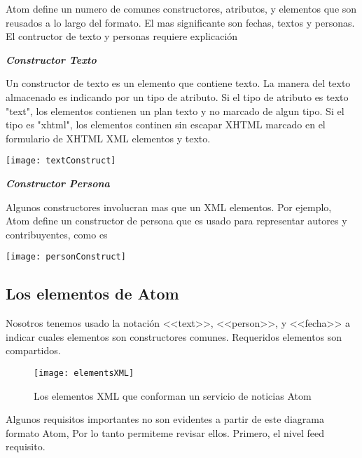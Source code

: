 Atom define un numero de comunes constructores, atributos, y elementos que son reusados a lo largo del formato.
El mas significante son fechas, textos y personas. El contructor de texto y personas requiere explicación


\textbf{\textit{Constructor Texto}}

Un constructor de texto es un elemento que contiene texto. La manera del texto almacenado es indicando
por un tipo de atributo. Si el tipo de atributo es texto "text", los elementos contienen un plan
texto y no marcado de algun tipo. Si el tipo es "xhtml", los elementos continen sin escapar XHTML marcado
en el formulario de XHTML XML elementos y texto.

\begin{minipage}[t]{0.4\textwidth}

\begin{center}

\texttt{[image: textConstruct]}

\end{center}

\end{minipage}

\textbf{\textit{Constructor Persona}}

Algunos constructores involucran mas que un XML elementos. Por ejemplo, Atom define un constructor de 
persona que es usado para representar autores y contribuyentes, como es

\begin{minipage}{0.5\textwidth}
\centering
\texttt{[image: personConstruct]}
\end{minipage}

\subsection{Los elementos de Atom}

Nosotros tenemos usado la notación <<text>>, <<person>>, y <<fecha>> a indicar cuales elementos son constructores
comunes. Requeridos elementos son compartidos.

\begin{figure}[!ht]
\centering
\texttt{[image: elementsXML]}
\caption{Los elementos XML que conforman un servicio de noticias Atom}
\end{figure}

Algunos requisitos importantes no son evidentes a partir de este diagrama formato Atom, Por lo tanto permiteme
revisar ellos. Primero, el nivel feed requisito.

